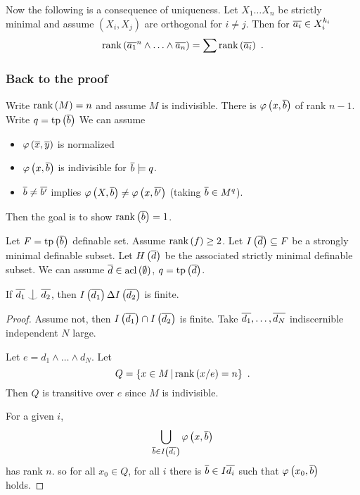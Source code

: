 \documentclass{amsart}
\begin{document}
Now the following is a consequence of uniqueness.
Let $X_1 \ldots X_n$ be strictly minimal 
and assume $\left(X_i , X_j\right)$ are orthogonal for $i\neq j$.
Then for $\overline{a_i}\in X_i^{k_i}$
\begin{equation}
\operatorname{rank}\left(\overline{a_1}^n \land \ldots \land\overline{a_n}\right)
= \sum \operatorname{rank}\left(\overline{a_i}\right) \ .
\end{equation}

\subsubsection{Back to the proof}

Write $\operatorname{rank}\left(M\right) = n$ and assume $M$ is indivisible. There is $\varphi\left(x ,
\overline{b}\right)$ of rank $n-1$. Write $q  = \operatorname{tp}\left(\overline{b}\right)$
We can assume
\begin{itemize}
\item $\varphi\left(\overline{x} , \overline{y}\right)$ is normalized
\item $\varphi\left(x , \overline{b}\right)$ is indivisible for $\overline{b}\models q$.
\item $\overline{b}\neq \overline{b'}$ implies $\varphi\left(X , \overline{b}\right)\neq \varphi\left(x ,
\overline{b'}\right)$ (taking $\overline{b}\in M^q$).
\end{itemize}

Then the goal is to show $\operatorname{rank}\left(\overline{b}\right) = 1$. 

Let $F = \operatorname{tp}\left(\overline{b}\right)$ definable set. Assume $\operatorname{rank}\left(f\right)\geq 2$. 
Let $I\left(\overline{d}\right)\subseteq F$ be a strongly minimal definable subset.
Let $H\left(\overline{d}\right)$ be the associated strictly minimal definable subset.
We can assume $\overline{d}\in \operatorname{acl}\left(\emptyset\right)$, $q= \operatorname{tp}\left(\overline{d}\right)$.

\begin{clm}
If $\oline{d_1}\indfrom \oline{d_2}$, then $I\left(\overline{d_1}\right)\Delta
I\left(\overline{d_2}\right)$ is finite. 
\end{clm}

\begin{proof}
Assume not, then $I\left(\overline{d_1}\right)\cap I\left(\overline{d_2}\right)$ is finite. Take
$\overline{d_1}, \ldots , \overline{d_N}$ indiscernible independent $N$ large. 

Let $e = d_1\land \ldots \land d_N$. Let
\begin{equation}
Q = \left\{x\in M \, \middle\vert \, \operatorname{rank}\left(x/e\right) = n\right\} \ .
\end{equation}
Then $Q$ is transitive over $e$ since $M$ is indivisible. 

For a given $i$, 
\begin{equation}
\bigcup_{\overline{b}\in I\left(\overline{d_i}\right)} \varphi\left(x , \overline{b}\right)
\end{equation}
has rank $n$. so for all $x_0\in Q$, for all $i$ there is $\overline{b}\in I \overline{d_i}$
such that $\varphi\left(x_0 , \overline{b}\right)$ holds.
\end{proof}
\end{document}
